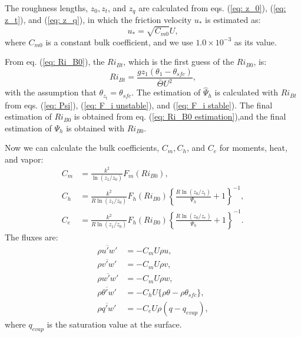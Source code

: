 The roughness lengths, $z_0, z_t$, and $z_q$ are calculated from
eqs. (\ref{eq: z_0}), (\ref{eq: z_t}), and (\ref{eq: z_q}),
in which the friction velocity $u_*$ is estimated as:
\begin{equation}
  u_* = \sqrt{C_{m0}} U,
\end{equation}
where $C_{m0}$ is a constant bulk coefficient,
and we use $1.0 \times 10^{-3}$ as its value.

From eq. (\ref{eq: Ri_B0}), the $Ri_{Bt}$, which is the first guess of the $Ri_{B0}$, is:
\begin{equation}
  Ri_{Bt} = \frac{gz_1(\theta_1-\theta_{sfc})}{\bar{\Theta}U^2},
\end{equation}
with the assumption that $\theta_{z_t} = \theta_{sfc}$.
The estimation of $\hat{\Psi}_h$ is calculated with $Ri_{Bt}$ from
eqs. (\ref{eq: Psi}), (\ref{eq: F_i unstable}), and (\ref{eq: F_i stable}).
The final estimation of $Ri_{B0}$ is obtained from eq. (\ref{eq: Ri_B0 estimation}),and the final estimation of $\Psi_h$ is obtained with $Ri_{B0}$.

Now we can calculate the bulk coefficients, $C_m, C_h$, and $C_e$ for moments, heat, and vapor:
\begin{align}
  C_m &= \frac{k^2}{\ln(z_1/z_0)}F_m(Ri_{B0}), \\
  C_h &= \frac{k^2}{R\ln(z_1/z_0)}F_h(Ri_{B0})\left\{\frac{R\ln(z_0/z_t)}{\Psi_h}+1\right\}^{-1}, \\
  C_e &= \frac{k^2}{R\ln(z_1/z_0)}F_h(Ri_{B0})\left\{\frac{R\ln(z_0/z_e)}{\Psi_h}+1\right\}^{-1}.
\end{align}
The fluxes are:
\begin{align}
  \overline{\rho u'w'} &= - C_m U \rho u, \\
  \overline{\rho v'w'} &= - C_m U \rho v, \\
  \overline{\rho w'w'} &= - C_m U \rho w, \\
  \overline{\rho \theta'w'} &= - C_h U \{\rho \theta - \rho \theta_{sfc}\}, \\
  \overline{\rho q'w'} &= -C_e U \rho ( q - q_{evap} ),
\end{align}
where $q_{evap}$ is the saturation value at the surface.


